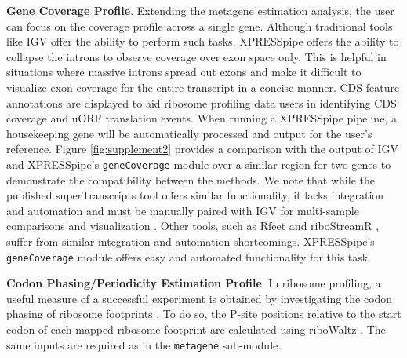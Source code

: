 \documentclass[10pt, oneside]{article}
\begin{document}
\noindent\textbf{Gene Coverage Profile}. Extending the metagene estimation analysis, the user can focus on the coverage profile across a single gene. Although traditional tools like IGV \cite{igv} offer the ability to perform such tasks, XPRESSpipe offers the ability to collapse the introns to observe coverage over exon space only. This is helpful in situations where massive introns spread out exons and make it difficult to visualize exon coverage for the entire transcript in a concise manner. CDS feature annotations are displayed to aid ribosome profiling data users in identifying CDS coverage and uORF translation events. When running a XPRESSpipe pipeline, a housekeeping gene will be automatically processed and output for the user's reference. Figure \ref{fig:supplement2} provides a comparison with the output of IGV \cite{igv} and XPRESSpipe's \texttt{geneCoverage} module over a similar region for two genes to demonstrate the compatibility between the methods. We note that while the published superTranscripts tool offers similar functionality, it lacks integration and automation and must be manually paired with IGV for multi-sample comparisons and visualization \cite{supertranscripts}. Other tools, such as Rfeet and riboStreamR \cite{pausepred, ribostreamr}, suffer from similar integration and automation shortcomings. XPRESSpipe's \texttt{geneCoverage} module offers easy and automated functionality for this task.\par

\noindent\textbf{Codon Phasing/Periodicity Estimation Profile}. In ribosome profiling, a useful measure of a successful experiment is obtained by investigating the codon phasing of ribosome footprints \cite{ingolia_meth}. To do so, the P-site positions relative to the start codon of each mapped ribosome footprint are calculated using riboWaltz \cite{ribowaltz}. The same inputs are required as in the \texttt{metagene} sub-module.\par
\end{document}
